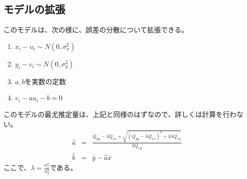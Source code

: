 \subsection{モデルの拡張}
このモデルは、次の様に、誤差の分散について拡張できる。
\begin{enumerate}
 \item $x_i-u_i \sim N(0,\sigma_x^2)$
 \item $y_i-v_i \sim N(0,\sigma_y^2)$
 \item $a,b$を実数の定数
 \item $v_i -a u_i -b = 0$
\end{enumerate}
このモデルの最尤推定量は、上記と同様のはずなので、詳しくは計算を行わない。
\begin{eqnarray*}
 \hat{a} &=& \frac{Q_{yy}-\lambda Q_{xx}+\sqrt{(Q_{yy}-\lambda Q_{xx})^2+4\lambda Q_{xy}}}{2Q_{xy}} \\
 \hat{b} &=& \bar{y}-\hat{a}\bar{x}
\end{eqnarray*}
ここで、$\lambda = \frac{\sigma_x^2}{\sigma_y^2}$である。


\fi




